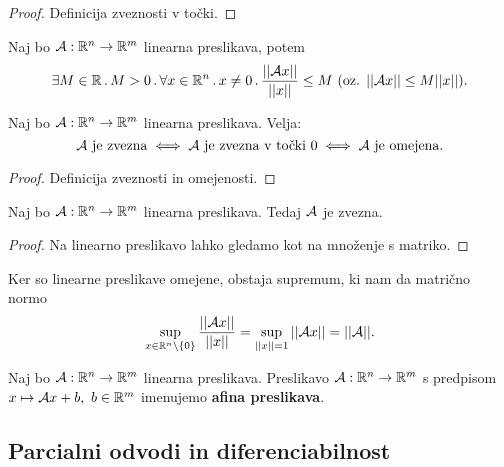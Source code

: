 \begin{proof}
    Definicija zveznosti v točki.
\end{proof}

\begin{zgled}
    Naj bo $\mathcal{A}: \mathbb{R}^n \to \mathbb{R}^m$ linearna preslikava, potem $$\exists  M \in \mathbb{R} \, . \, M > 0 \,.\, \forall x \in \mathbb{R}^n \, . \, x \neq 0  \,.\,  \frac{||\mathcal{A}x||}{||x||} \leq M \ (\text{oz. } ||\mathcal{A}x|| \leq M ||x|| ).$$
\end{zgled}

\begin{trditev}
    Naj bo $\mathcal{A}: \mathbb{R}^n \to \mathbb{R}^m$ linearna preslikava. Velja:
    $$\mathcal{A} \text{ je zvezna} \iff \mathcal{A} \text{ je zvezna v točki } 0 \iff \mathcal{A} \text{ je omejena}.$$
\end{trditev}

\begin{proof}
    Definicija zveznosti in omejenosti.
\end{proof}

\begin{trditev}
    Naj bo $\mathcal{A}: \mathbb{R}^n \to \mathbb{R}^m$ linearna preslikava. Tedaj \(\mathcal{A}\) je zvezna.
\end{trditev}

\begin{proof}
    Na linearno preslikavo lahko gledamo kot na množenje s matriko.
\end{proof}

\begin{opomba}
    Ker so linearne preslikave omejene, obstaja supremum, ki nam da matrično normo
    \[\sup_{x \in \mathbb{R}^n \setminus \left\{0\right\}} \frac{||\mathcal{A} x||}{||x||} = \sup_{||x|| = 1} ||\mathcal{A} x||= ||\mathcal{A}||.\]
\end{opomba}

\begin{definicija}
    Naj bo $\mathcal{A}: \mathbb{R}^n \to \mathbb{R}^m$ linearna preslikava. Preslikavo $\mathcal{A}: \mathbb{R}^n \to \mathbb{R}^m$ s predpisom $x \mapsto \mathcal{A}x + b, \ b \in \mathbb{R}^m$ imenujemo \textbf{afina preslikava}.
\end{definicija}

\newpage
\subsection{Parcialni odvodi in diferenciabilnost}

